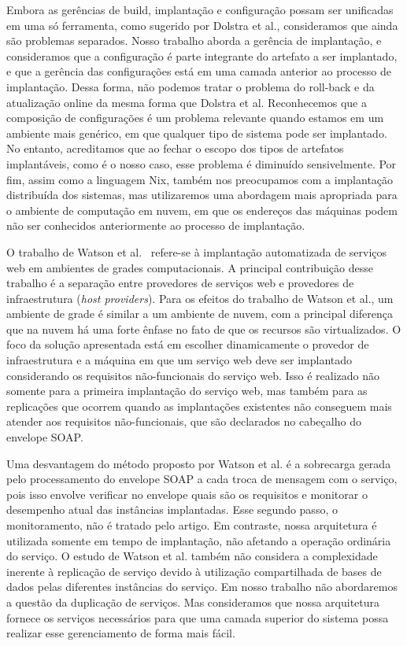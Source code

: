 Embora as gerências de build, implantação e configuração possam ser unificadas em uma só ferramenta, como sugerido por Dolstra et al., consideramos que ainda são problemas separados. Nosso trabalho aborda a gerência de implantação, e consideramos que a configuração é parte integrante do artefato a ser implantado, e que a gerência das configurações está em uma camada anterior ao processo de implantação. Dessa forma, não podemos tratar o problema do roll-back e da atualização online da mesma forma que Dolstra et al. Reconhecemos que a composição de configurações é um problema relevante quando estamos em um ambiente mais genérico, em que qualquer tipo de sistema pode ser implantado. No entanto, acreditamos que ao fechar o escopo dos tipos de artefatos implantáveis, como é o nosso caso, esse problema é diminuído sensivelmente. Por fim, assim como a linguagem Nix, também nos preocupamos com a implantação distribuída dos sistemas, mas utilizaremos uma abordagem mais apropriada para o ambiente de computação em nuvem, em que os endereços das máquinas podem não ser conhecidos anteriormente ao processo de implantação.

O trabalho de Watson et al.~\cite{Watson2006Dynasoar} refere-se à implantação automatizada de serviços web em ambientes de grades computacionais. A principal contribuição desse trabalho é a separação entre provedores de serviços web e provedores de infraestrutura (\emph{host providers}). Para os efeitos do trabalho de Watson et al., um ambiente de grade é similar a um ambiente de nuvem, com a principal diferença que na nuvem há uma forte ênfase no fato de que os recursos são virtualizados. O foco da solução apresentada está em escolher dinamicamente o provedor de infraestrutura e a máquina em que um serviço web deve ser implantado considerando os requisitos não-funcionais do serviço web. Isso é realizado não somente para a primeira implantação do serviço web, mas também para as replicações que ocorrem quando as implantações existentes não conseguem mais atender aos requisitos não-funcionais, que são declarados no cabeçalho do envelope SOAP.

Uma desvantagem do método proposto por Watson et al. é a sobrecarga gerada pelo processamento do envelope SOAP a cada troca de mensagem com o serviço, pois isso envolve verificar no envelope quais são os requisitos e monitorar o desempenho atual das instâncias implantadas. Esse segundo passo, o monitoramento, não é tratado pelo artigo. Em contraste, nossa arquitetura é utilizada somente em tempo de implantação, não afetando a operação ordinária do serviço. O estudo de Watson et al. também não considera a complexidade inerente à replicação de serviço devido à utilização compartilhada de bases de dados pelas diferentes instâncias do serviço.  Em nosso trabalho não abordaremos a questão da duplicação de serviços. Mas consideramos que nossa arquitetura fornece os serviços necessários para que uma camada superior do sistema possa realizar esse gerenciamento de forma mais fácil.

